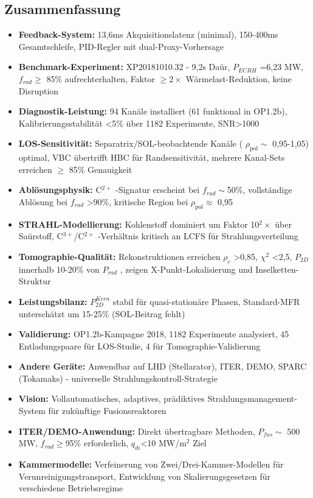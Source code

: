 \documentclass[11pt,a4paper]{article}
\begin{document}
\subsection{Zusammenfassung}

\begin{itemize}
\item \textbf{Feedback-System:} 13,6ms Akquisitionslatenz (minimal), 150-400ms Gesamtschleife, PID-Regler mit dual-Proxy-Vorhersage
\item \textbf{Benchmark-Experiment:} XP20181010.32 - 9,2s Daür, $P_{ECRH}$ =6,23 MW, $f_{rad} \geq $ 85\% aufrechterhalten, Faktor $\geq2\times$ Wärmelast-Reduktion, keine Disruption
\item \textbf{Diagnostik-Leistung:} 94 Kanäle installiert (61 funktional in OP1.2b), Kalibrierungsstabilität <5\% über 1182 Experimente, SNR>1000
\item \textbf{LOS-Sensitivität:} Separatrix/SOL-beobachtende Kanäle ( $\rho_{\text{pol}} \sim$ 0,95-1,05) optimal, VBC übertrifft HBC für Randsensitivität, mehrere Kanal-Sets erreichen $\geq$ 85\% Genauigkeit
\item \textbf{Ablösungsphysik:} C$^{2+}$ -Signatur erscheint bei $f_{rad}\sim$50\%, vollständige Ablösung bei $ f_{rad} $ >90\%, kritische Region bei $\rho_{\text{pol}}\approx$ 0,95
\item \textbf{STRAHL-Modellierung:} Kohlenstoff dominiert um Faktor 10$^2\times$ über Saürstoff, C$^{3+}$/C$^{2+}$ -Verhältnis kritisch an LCFS für Strahlungsverteilung
\item \textbf{Tomographie-Qualität:} Rekonstruktionen erreichen $\rho_c$ >0,85, $\chi^2$ <2,5, $ P_{2D} $ innerhalb 10-20\% von $P_{rad}$ , zeigen X-Punkt-Lokalisierung und Inselketten-Struktur
\item \textbf{Leistungsbilanz:} $P_{2D}^{Kern} $ stabil für quasi-stationäre Phasen, Standard-MFR unterschätzt um 15-25\% (SOL-Beitrag fehlt)
\item \textbf{Validierung:} OP1.2b-Kampagne 2018, 1182 Experimente analysiert, 45 Entladungspaare für LOS-Studie, 4 für Tomographie-Validierung

\item \textbf{Andere Geräte:} Anwendbar auf LHD (Stellarator), ITER, DEMO, SPARC (Tokamaks) - universelle Strahlungskontroll-Strategie
\item \textbf{Vision:} Vollautomatisches, adaptives, prädiktives Strahlungsmanagement-System für zukünftige Fusionsreaktoren
\item \textbf{ITER/DEMO-Anwendung:} Direkt übertragbare Methoden, $P_{fus}\sim$ 500 MW, $f_{rad}\geq$95\% erforderlich, $q_{di}$<10 MW/m$^2$ Ziel
\item \textbf{Kammermodelle:} Verfeinerung von Zwei/Drei-Kammer-Modellen für Verunreinigungstransport, Entwicklung von Skalierungsgesetzen für verschiedene Betriebsregime
\end{itemize}
\end{document}
